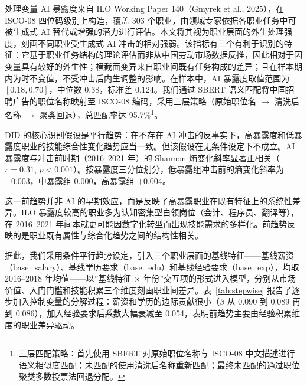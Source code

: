 \documentclass[12pt, a4paper]{article}
\begin{document}
处理变量 AI 暴露度来自 ILO Working Paper 140（Gmyrek et al., 2025），在 ISCO-08 四位码级别上构造，覆盖 303 个职业，由领域专家依据各职业任务中可被生成式 AI 替代或增强的潜力进行评估。本文将其视为职业层面的外生处理强度，刻画不同职业受生成式 AI 冲击的相对强弱。该指标有三个有利于识别的特征：它基于职业任务结构的理论评估而非从中国劳动市场数据反推，因此相对于因变量具有较好的外生性；横截面变异来自职业间既有任务构成的差异；且在样本期内为时不变值，不受冲击后内生调整的影响。在样本中，AI 暴露度取值范围为 $[0.18, 0.70]$，中位数 0.38，标准差 0.124。我们通过 SBERT 语义匹配将中国招聘广告的职位名称映射至 ISCO-08 编码，采用三层策略（原始职位名 $\to$ 清洗后名称 $\to$ 聚类回退），总匹配率达 95.7\%\footnote{三层匹配策略：首先使用 SBERT 对原始职位名称与 ISCO-08 中文描述进行语义相似度匹配；未匹配的使用清洗后名称重新匹配；最终未匹配的通过职位聚类多数投票法回退分配。}。

DID 的核心识别假设是平行趋势：在不存在 AI 冲击的反事实下，高暴露度和低暴露度职业的技能综合性变化趋势应当一致。但该假设在无条件设定下不成立。AI 暴露度与冲击前时期（2016--2021 年）的 Shannon 熵变化斜率显著正相关（$r = 0.31$, $p < 0.001$）。按暴露度三分位划分，低暴露组冲击前的熵变化斜率为 $-0.003$，中暴露组 $0.000$，高暴露组 $+0.004$。

这一前趋势并非 AI 的早期效应，而是反映了高暴露职业在既有特征上的系统性差异。ILO 暴露度较高的职业多为认知密集型白领岗位（会计、程序员、翻译等），在 2016--2021 年间本就更可能因数字化转型而出现技能需求的多样化。前趋势反映的是职业既有属性与综合化趋势之间的结构性相关。

据此，我们采用条件平行趋势设定，引入三个职业层面的基线特征——基线薪资（base\_salary）、基线学历要求（base\_edu）和基线经验要求（base\_exp），均取 2016--2018 年均值——以”基线特征 $\times$ 年份”交互项的形式进入模型，分别从市场价值、入门门槛和技能积累三个维度刻画职业间差异。表~\ref{tab:stepwise} 报告了逐步加入控制变量的分解过程：薪资和学历的边际贡献很小（$\beta$ 从 0.090 到 0.089 再到 0.086），加入经验要求后系数大幅衰减至 0.054，表明前趋势主要由经验积累维度的职业差异驱动。
\end{document}
